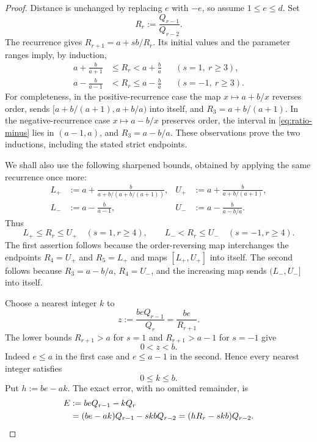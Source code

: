 \begin{proof}
Distance is unchanged by replacing $e$ with $-e$, so assume $1\le e\le d$.
Set
\[
R_r:=\frac{Q_{r-1}}{Q_{r-2}}.
\]
The recurrence gives $R_{r+1}=a+sb/R_r$.  Its initial values and the parameter
ranges imply, by induction,
\begin{align}
a+\frac{b}{a+1}&\le R_r<a+\frac ba &&(s=1,\ r\ge3),
\label{eq:ratio-plus}\\
a-\frac{b}{a-1}&<R_r\le a-\frac ba &&(s=-1,\ r\ge3).
\label{eq:ratio-minus}
\end{align}
For completeness, in the positive-recurrence case the map
$x\mapsto a+b/x$ reverses order, sends
$[a+b/(a+1),a+b/a)$ into itself, and $R_3=a+b/(a+1)$.
In the negative-recurrence case $x\mapsto a-b/x$ preserves order, the interval
in \eqref{eq:ratio-minus} lies in $(a-1,a)$, and $R_3=a-b/a$.
These observations prove the two inductions, including the stated strict
endpoints.

We shall also use the following sharpened bounds, obtained by applying the
same recurrence once more:
\begin{align*}
L_+&:=a+\frac{b}{a+b/(a+b/(a+1))},&
U_+&:=a+\frac{b}{a+b/(a+1)},\\
L_-&:=a-\frac{b}{a-1},&
U_-&:=a-\frac{b}{a-b/a}.
\end{align*}
Thus
\begin{equation}
L_+\le R_r\le U_+\quad(s=1,r\ge4),
\qquad
L_-<R_r\le U_-\quad(s=-1,r\ge4).
\label{eq:sharpened-ratio-bounds}
\end{equation}
The first assertion follows because the order-reversing map interchanges the
endpoints $R_4=U_+$ and $R_5=L_+$ and maps $[L_+,U_+]$ into itself.  The
second follows because $R_3=a-b/a$, $R_4=U_-$, and the increasing map sends
$(L_-,U_-]$ into itself.

Choose a nearest integer $k$ to
\[
z:=\frac{beQ_{r-1}}{Q_r}=\frac{be}{R_{r+1}}.
\]
The lower bounds $R_{r+1}>a$ for $s=1$ and $R_{r+1}>a-1$ for $s=-1$ give
\[
0<z<b.
\]
Indeed $e\le a$ in the first case and $e\le a-1$ in the second.  Hence every
nearest integer satisfies
\begin{equation}
0\le k\le b.
\label{eq:nearest-k-bound}
\end{equation}
Put $h:=be-ak$.  The exact error, with no omitted remainder, is
\begin{align}
E&:=beQ_{r-1}-kQ_r\notag\\
 &=(be-ak)Q_{r-1}-skbQ_{r-2}
   =(hR_r-skb)Q_{r-2}.
\label{eq:nearest-error}
\end{align}


\end{proof}

